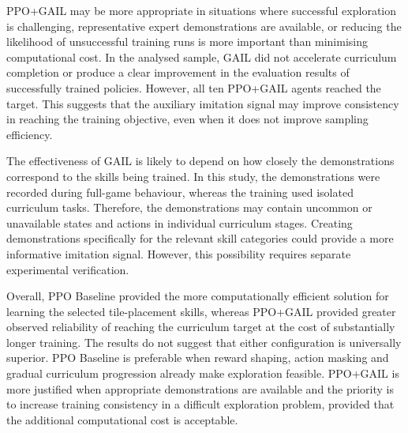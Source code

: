 PPO+GAIL may be more appropriate in situations where successful exploration is challenging, representative expert demonstrations are available, or reducing the likelihood of unsuccessful training runs is more important than minimising computational cost. In the analysed sample, GAIL did not accelerate curriculum completion or produce a clear improvement in the evaluation results of successfully trained policies. However, all ten PPO+GAIL agents reached the target. This suggests that the auxiliary imitation signal may improve consistency in reaching the training objective, even when it does not improve sampling efficiency.

The effectiveness of GAIL is likely to depend on how closely the demonstrations correspond to the skills being trained. In this study, the demonstrations were recorded during full-game behaviour, whereas the training used isolated curriculum tasks. Therefore, the demonstrations may contain uncommon or unavailable states and actions in individual curriculum stages. Creating demonstrations specifically for the relevant skill categories could provide a more informative imitation signal. However, this possibility requires separate experimental verification.

Overall, PPO Baseline provided the more computationally efficient solution for learning the selected tile-placement skills, whereas PPO+GAIL provided greater observed reliability of reaching the curriculum target at the cost of substantially longer training. The results do not suggest that either configuration is universally superior. PPO Baseline is preferable when reward shaping, action masking and gradual curriculum progression already make exploration feasible. PPO+GAIL is more justified when appropriate demonstrations are available and the priority is to increase training consistency in a difficult exploration problem, provided that the additional computational cost is acceptable.


